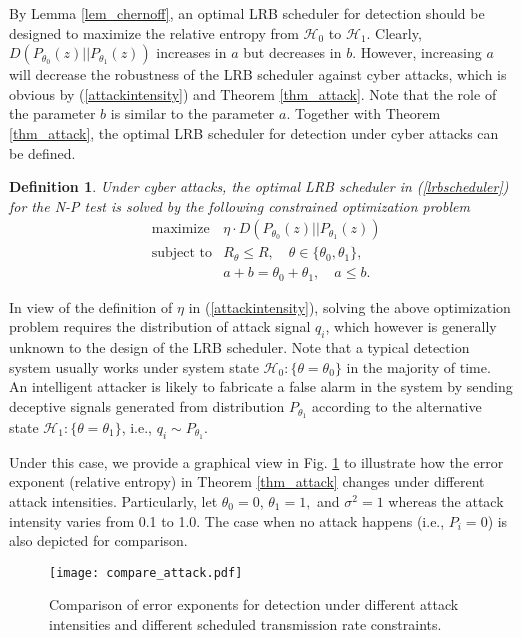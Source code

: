 \documentclass[journal]{IEEEtran}
\def\cH{\mathcal{H}}
\newtheorem{defi}{Definition}
\begin{document}
By Lemma \ref{lem_chernoff}, an optimal LRB scheduler for detection should be designed to maximize the relative entropy from $\cH_0$ to $\cH_1$. Clearly,  $D(P_{\theta_0}({z})||P_{\theta_1}({z}))$ increases in $a$ but decreases in $b$. However, increasing $a$ will decrease the robustness of the LRB scheduler against cyber attacks, which is obvious by (\ref{attackintensity}) and Theorem \ref{thm_attack}. Note that the role of the parameter $b$ is similar to the parameter $a$. Together with Theorem \ref{thm_attack}, the optimal LRB scheduler for detection under cyber attacks can be defined.

\begin{defi}
Under cyber attacks, the optimal LRB scheduler in (\ref{lrbscheduler}) for the N-P test is solved by the following constrained optimization problem
\begin{eqnarray*}
&\text{maximize} & \eta \cdot D(P_{\theta_0}({z})||P_{\theta_1}({z}))\\
&\text{subject to}& R_{\theta}\leqslant R ,\quad \theta\in\{\theta_0, \theta_1\},\\
&&a+b=\theta_0+\theta_1,\quad a\leqslant b.
\end{eqnarray*}
\end{defi}

In view of the definition of $\eta$ in (\ref{attackintensity}), solving the above optimization problem requires the distribution of attack signal $q_i$, which however is generally unknown to the design of the LRB scheduler. Note that a typical detection system usually works under system state $\cH_0: \{\theta=\theta_0\}$ in the majority of time. An intelligent attacker is likely to fabricate a false alarm in the system by sending deceptive signals generated from distribution $P_{\theta_1}$ according to the alternative state $\cH_1:\{\theta=\theta_1\}$, i.e., $q_i\sim P_{\theta_1}$.

Under this case, we provide a graphical view in Fig. \ref{fig_comparison2} to illustrate how the error exponent (relative entropy) in Theorem \ref{thm_attack} changes under different attack intensities. Particularly, let $\theta_{0}=0$, $\theta_{1}=1,$ and $\sigma^2=1$ whereas the attack intensity varies from 0.1 to 1.0. The case when no attack happens (i.e., $P_i=0$) is also depicted for comparison.

\begin{figure}[htbp!]
  \centering
  \texttt{[image: compare\_attack.pdf]}
    \caption{ Comparison of error exponents for detection under different attack intensities and different scheduled transmission rate constraints.}
    \label{fig_comparison2}
\end{figure}
\end{document}
